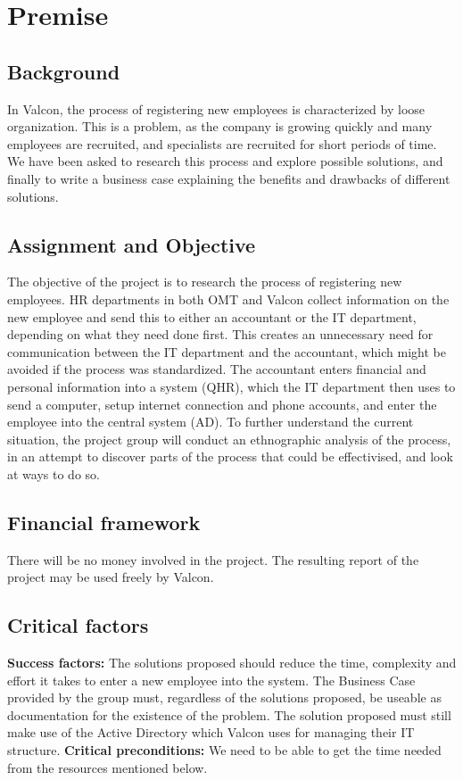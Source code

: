 \section{Premise}

\subsection{Background}
In Valcon, the process of registering new employees is characterized by loose organization. This is a problem, as the company is growing quickly and many employees are recruited, and specialists are recruited for short periods of time. We have been asked to research this process and explore possible solutions, and finally to write a business case explaining the benefits and drawbacks of different solutions.

\subsection{Assignment and Objective}
The objective of the project is to research the process of registering new employees. HR departments in both OMT and Valcon collect information on the new employee and send this to either an accountant or the IT department, depending on what they need done first. This creates an unnecessary need for communication between the IT department and the accountant, which might be avoided if the process was standardized. The accountant enters financial and personal information into a system (QHR), which the IT department then uses to send a computer, setup internet connection and phone accounts, and enter the employee into the central system (AD). To further understand the current situation, the project group will conduct an ethnographic analysis of the process, in an attempt to discover parts of the process that could be effectivised, and look at ways to do so.

\subsection{Financial framework}
There will be no money involved in the project.
The resulting report of the project may be used freely by Valcon.

\subsection{Critical factors}
\textbf{Success factors:}
The solutions proposed should reduce the time, complexity and effort it takes to enter a new employee into the system.
The Business Case provided by the group must, regardless of the solutions proposed, be useable as documentation for the existence of the problem.
The solution proposed must still make use of the Active Directory which Valcon uses for managing their IT structure.
\textbf{Critical preconditions:}
We need to be able to get the time needed from the resources mentioned below.


